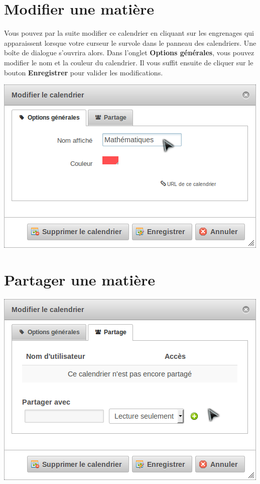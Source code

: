 \documentclass[a4paper, 11pt]{report}
\begin{document}
		\section{Modifier une matière}
			Vous pouvez par la suite modifier ce calendrier en cliquant sur les engrenages qui apparaissent lorsque votre curseur le survole dans le panneau des calendriers. Une boîte de dialogue s’ouvrira alors. Dans l’onglet \textbf{Options générales}, vous pouvez modifier le nom et la couleur du calendrier. Il vous suffit ensuite de cliquer sur le bouton \textbf{Enregistrer} pour valider les modifications.

			\begin{center}
				\includegraphics[scale = 0.7]{modifier_calendrier.png}
			\end{center}

		\section{\og Partager \fg{} une matière}
			\begin{center}
				\includegraphics[scale = 0.7]{partager_calendrier.png}
			\end{center}
\end{document}
